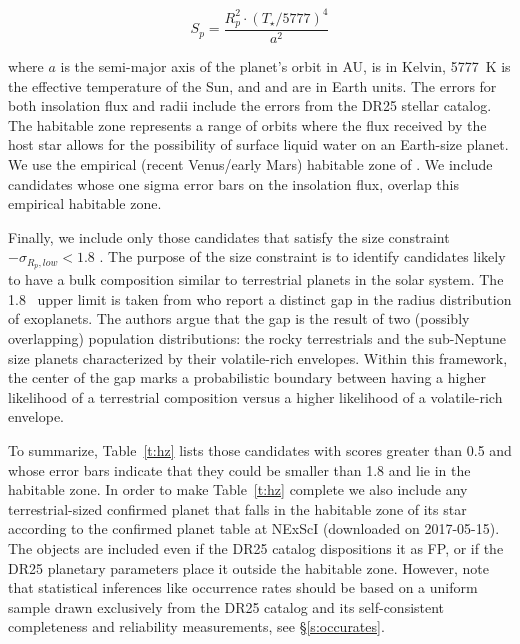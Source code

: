 \begin{equation}
S_{p} = \frac{R_{p}^{2} \cdot (T_{\star}/5777)^{4}}{a^{2}}
\end{equation}

\noindent where $a$ is the semi-major axis of the planet's orbit in AU, \tstar{} is in Kelvin, 5777~K is the effective temperature of the Sun, and \sp{} and \rp{} are in Earth units. The errors for both insolation flux and radii include the errors from the DR25 stellar catalog. The habitable zone represents a range of orbits where the flux received by the host star allows for the possibility of surface liquid water on an Earth-size planet.  We use the empirical (recent Venus/early Mars) habitable zone of \citet{Kopparapu2013}.  We include candidates whose one sigma error bars on the insolation flux, overlap this empirical habitable zone.  

Finally, we include only those candidates that satisfy the size constraint \rp $- \sigma_{{R_p},low} < 1.8$ \re.  The purpose of the size constraint is to identify candidates likely to have a bulk composition similar to terrestrial planets in the solar system.  The 1.8 \re\ upper limit is taken from \citet{Fulton2017} who report a distinct gap in the radius distribution of exoplanets.  The authors argue that the gap is the result of two (possibly overlapping) population distributions: the rocky terrestrials and the sub-Neptune size planets characterized by their volatile-rich envelopes.  Within this framework, the center of the gap marks a probabilistic boundary between having a higher likelihood of a terrestrial composition versus a higher likelihood of a volatile-rich envelope.

To summarize, Table~\ref{t:hz} lists those candidates with scores greater than 0.5 and whose error bars indicate that they could be smaller than 1.8 \re{} and lie in the habitable zone.  In order to make Table~\ref{t:hz} complete we also include any terrestrial-sized confirmed planet that falls in the habitable zone of its star according to the confirmed planet table at NExScI (downloaded on 2017-05-15). The objects are included even if the DR25 catalog dispositions it as FP, or if the DR25 planetary parameters place it outside the habitable zone. However, note that statistical inferences like occurrence rates should be based on a uniform sample drawn exclusively from the DR25 catalog and its self-consistent completeness and reliability measurements, see \S\ref{s:occurates}.  




